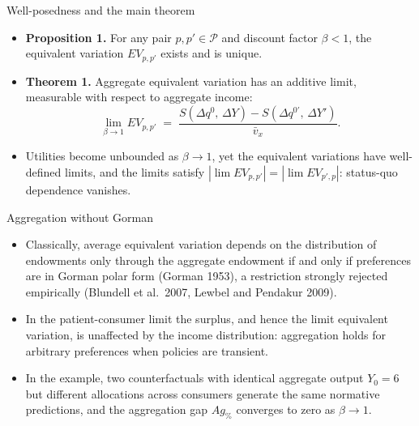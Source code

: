 \documentclass[aspectratio=169,11pt]{beamer}
\begin{document}
\begin{frame}{Well-posedness and the main theorem}
  \small
  \begin{itemize}
    \item \textbf{Proposition 1.} For any pair $p, p' \in \mathcal{P}$ and
          discount factor $\beta<1$, the equivalent variation $EV_{p,p'}$
          exists and is unique.
    \item \textbf{Theorem 1.} Aggregate equivalent variation has an additive
          limit, measurable with respect to aggregate income:
          \[ \lim_{\beta\to 1} EV_{p,p'} \;=\;
             \frac{S\!\left(\Delta q^{0},\,\Delta Y\right)
                   - S\!\left(\Delta q^{0\prime},\,\Delta Y'\right)}
                  {\bar v_{x}} . \]
    \item Utilities become unbounded as $\beta\to1$, yet the equivalent
          variations have well-defined limits, and the limits satisfy
          $|\lim EV_{p,p'}| = |\lim EV_{p',p}|$: status-quo dependence
          vanishes.
  \end{itemize}
\end{frame}

\begin{frame}{Aggregation without Gorman}
  \begin{itemize}
    \item Classically, average equivalent variation depends on the
          distribution of endowments only through the aggregate endowment if
          and only if preferences are in Gorman polar form (Gorman 1953),
          a restriction strongly rejected empirically (Blundell et al.\ 2007,
          Lewbel and Pendakur 2009).
    \item In the patient-consumer limit the surplus, and hence the limit
          equivalent variation, is unaffected by the income distribution:
          aggregation holds for arbitrary preferences when policies are
          transient.
    \item In the example, two counterfactuals with identical aggregate
          output $Y_0=6$ but different allocations across consumers generate
          the same normative predictions, and the aggregation gap
          $Ag_{\%}$ converges to zero as $\beta\to1$.
  \end{itemize}
\end{frame}
\end{document}
